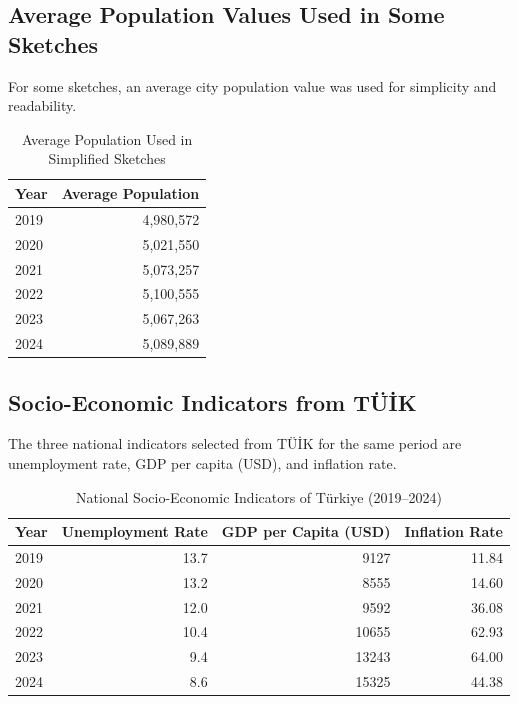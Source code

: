 \documentclass[11pt,a4paper]{article}
\begin{document}
\subsection{Average Population Values Used in Some Sketches}

For some sketches, an average city population value was used for simplicity and readability.

\begin{table}[H]
\centering
\caption{Average Population Used in Simplified Sketches}
\begin{tabular}{lr}
\toprule
\textbf{Year} & \textbf{Average Population} \\
\midrule
2019 & 4,980,572 \\
2020 & 5,021,550 \\
2021 & 5,073,257 \\
2022 & 5,100,555 \\
2023 & 5,067,263 \\
2024 & 5,089,889 \\
\bottomrule
\end{tabular}
\end{table}

\subsection{Socio-Economic Indicators from TÜİK}

The three national indicators selected from TÜİK for the same period are unemployment rate, GDP per capita (USD), and inflation rate.

\begin{table}[H]
\centering
\caption{National Socio-Economic Indicators of Türkiye (2019--2024)}
\begin{tabular}{lrrr}
\toprule
\textbf{Year} & \textbf{Unemployment Rate} & \textbf{GDP per Capita (USD)} & \textbf{Inflation Rate} \\
\midrule
2019 & 13.7 & 9127 & 11.84 \\
2020 & 13.2 & 8555 & 14.60 \\
2021 & 12.0 & 9592 & 36.08 \\
2022 & 10.4 & 10655 & 62.93 \\
2023 & 9.4 & 13243 & 64.00 \\
2024 & 8.6 & 15325 & 44.38 \\
\bottomrule
\end{tabular}
\end{table}

\end{document}
